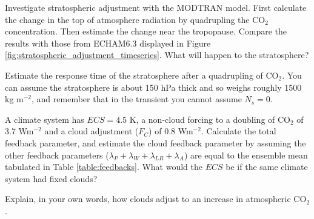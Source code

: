 \documentclass[12pt]{book}
\begin{document}
\newpage
\vspace{1 cm}
{\setlength{\parindent}{0cm}






\begin{exercise}
Investigate stratospheric adjustment with the MODTRAN model. First calculate the change in the top of atmosphere radiation by quadrupling the CO$_2$ concentration. Then estimate the change near the tropopause. Compare the results with those from ECHAM6.3 displayed in Figure \ref{fig:stratospheric_adjustment_timeseries}. What will happen to the stratosphere?
\end{exercise}

\begin{exercise}
Estimate the response time of the stratosphere after a quadrupling of CO$_2$. You can assume the stratosphere is about 150 hPa thick and so weighs roughly 1500 kg m$^{-2}$, and remember that in the transient you cannot assume $N_s=0$.
\end{exercise}

\begin{exercise}
A climate system has $ECS = 4.5$ K, a non-cloud forcing to a doubling of CO$_2$ of 3.7 Wm$^{-2}$ and a cloud adjustment ($F_C$) of 0.8 Wm$^{-2}$. Calculate the total feedback parameter, and estimate the cloud feedback parameter by assuming the other feedback parameters ($\lambda_P+\lambda_W+\lambda_{LR}+\lambda_A$) are equal to the ensemble mean tabulated in Table \ref{table:feedbacks}. What would the $ECS$ be if the same climate system had fixed clouds?
\end{exercise}

\begin{exercise}
Explain, in your own words, how clouds adjust to an increase in atmospheric CO$_2$.
\end{exercise}



}
\end{document}
